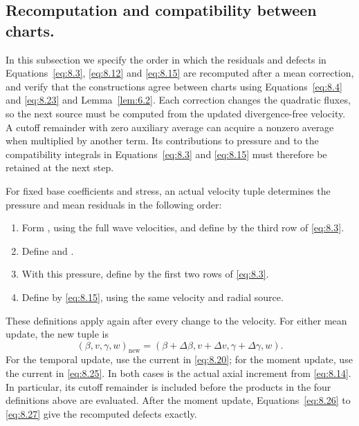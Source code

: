 \subsection{Recomputation and compatibility between charts.}\label{sec:8.7}
In this subsection we specify the order in which the residuals and defects in
Equations~\eqref{eq:8.3}, \eqref{eq:8.12} and \eqref{eq:8.15} are recomputed after a mean
correction, and verify that the constructions agree between charts using Equations~\eqref{eq:8.4}
and \eqref{eq:8.23} and Lemma~\ref{lem:6.2}. Each correction changes the quadratic fluxes, so the
next source must be computed from the updated divergence-free velocity. A cutoff remainder with zero
auxiliary average can acquire a nonzero average when multiplied by another term. Its contributions to
pressure and to the compatibility integrals in Equations~\eqref{eq:8.3} and \eqref{eq:8.15} must
therefore be retained at the next step.

%
For fixed base coefficients and stress, an actual velocity tuple
 determines the pressure and mean residuals in the
following order:
\begin{enumerate}[label=(\arabic*)]
\item Form , using the full wave
velocities, and define  by the third row of \eqref{eq:8.3}.
\item Define  and
.
\item With this pressure, define  by the first two rows of
\eqref{eq:8.3}.
\item Define  by \eqref{eq:8.15}, using the
same velocity and radial source.
\end{enumerate}
These definitions apply again after every change to the velocity. For either mean update, the new
tuple is
\[
(\beta,v,\gamma,w)_{\mathrm{new}}
=(\beta+\Delta\beta,v+\Delta v,\gamma+\Delta\gamma,w).
\]
For the temporal update, use the current  in
\eqref{eq:8.20}; for the moment update, use the current
 in \eqref{eq:8.25}. In both
cases  is the actual axial increment from \eqref{eq:8.14}. In
particular, its cutoff remainder is included before the products in the four definitions above are
evaluated. After the moment update, Equations~\eqref{eq:8.26} to \eqref{eq:8.27} give the
recomputed defects exactly.

